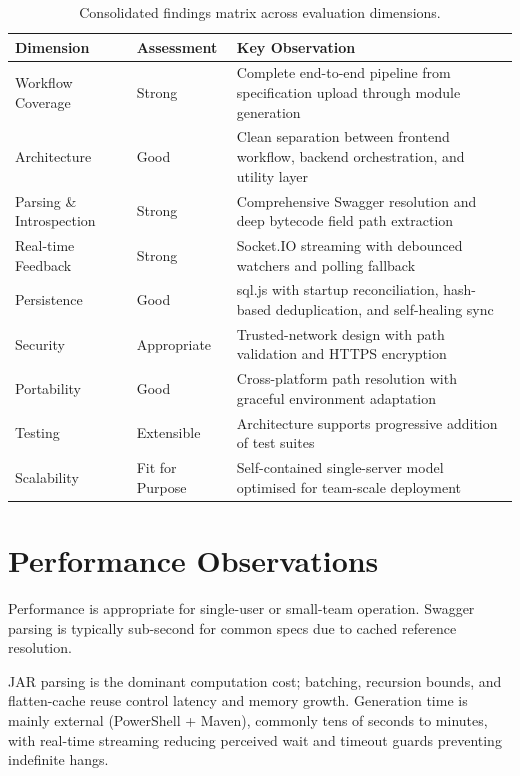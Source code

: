 \begin{table}[H]
\centering
\caption{Consolidated findings matrix across evaluation dimensions.}
\label{tab:findings}
\begin{tabular}{|p{3.5cm}|p{3.0cm}|p{6.0cm}|}
\hline
\textbf{Dimension} & \textbf{Assessment} & \textbf{Key Observation} \\
\hline
Workflow Coverage & Strong & Complete end-to-end pipeline from specification upload through module generation \\
\hline
Architecture & Good & Clean separation between frontend workflow, backend orchestration, and utility layer \\
\hline
Parsing \& Introspection & Strong & Comprehensive Swagger resolution and deep bytecode field path extraction \\
\hline
Real-time Feedback & Strong & Socket.IO streaming with debounced watchers and polling fallback \\
\hline
Persistence & Good & sql.js with startup reconciliation, hash-based deduplication, and self-healing sync \\
\hline
Security & Appropriate & Trusted-network design with path validation and HTTPS encryption \\
\hline
Portability & Good & Cross-platform path resolution with graceful environment adaptation \\
\hline
Testing & Extensible & Architecture supports progressive addition of test suites \\
\hline
Scalability & Fit for Purpose & Self-contained single-server model optimised for team-scale deployment \\
\hline
\end{tabular}
\end{table}

\section{Performance Observations}

Performance is appropriate for single-user or small-team operation. Swagger parsing is typically sub-second for common specs due to cached reference resolution.

JAR parsing is the dominant computation cost; batching, recursion bounds, and flatten-cache reuse control latency and memory growth. Generation time is mainly external (PowerShell + Maven), commonly tens of seconds to minutes, with real-time streaming reducing perceived wait and timeout guards preventing indefinite hangs.
